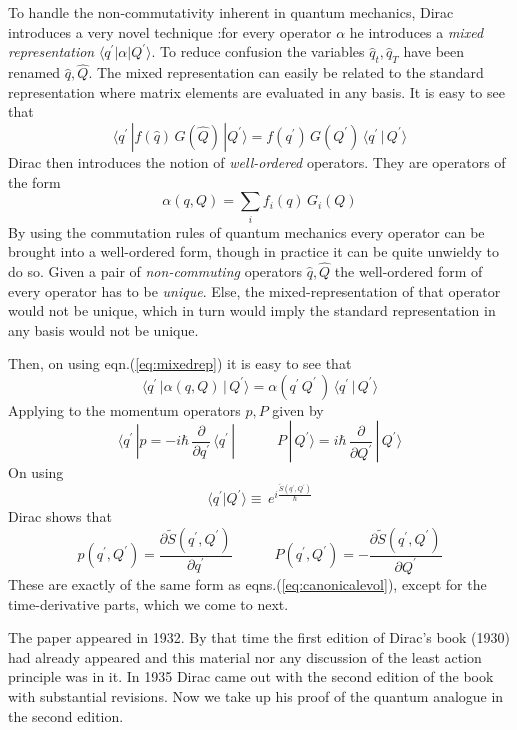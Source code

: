 \documentclass[12pt]{article}
\newcommand{\be}{\begin{equation}}
\newcommand{\ee}{\end{equation}}
\begin{document}
To handle the non-commutativity inherent in quantum mechanics, Dirac introduces a very novel technique \cite{diracpaper}:for every operator
$\alpha$ he introduces a {\it mixed representation} $\langle q^\prime|\alpha|Q^\prime\rangle$. To reduce confusion the variables 
${\hat q}_t, {\hat q}_T$
have been renamed ${\hat q},{\hat Q}$. The mixed representation can easily be related to the standard representation where matrix elements 
are evaluated 
in any basis. It is easy to see that
\be
\label{eq:mixedrep}
\langle q^\prime\,|f({\hat q})\,G({\hat Q})\,|Q^\prime \rangle  = f(q^\prime)\,G(Q^\prime)\,\langle q^\prime\,|\,Q^\prime\rangle
\ee
Dirac then introduces the notion of {\it well-ordered} operators. They are operators of the form 
\be
\label{eq:wellordered}
\alpha(q,Q) = \sum_i f_i(q)\,G_i(Q)
\ee
By using the commutation rules of quantum mechanics every operator can be brought into a well-ordered form, though in practice it can be
quite unwieldy to do so. Given a pair of \emph{non-commuting} operators ${\hat q}, {\hat Q}$ the well-ordered form of every operator has
to be \emph{unique}. Else, the mixed-representation of that operator would not be unique, which in turn would imply the standard representation
in any basis would not be unique.

Then, on using eqn.(\ref{eq:mixedrep}) it is easy to see that
\be
\label{eq:mixedrep2}
\langle q^\prime\,|\alpha(q,Q)\,|\,Q^\prime \rangle  = \alpha(q^\prime\,Q^\prime\,)\,\langle q^\prime\,|\,Q^\prime \rangle 
\ee
Applying to the momentum operators $p,P$ given by
\be
\label{eq:momenta}
\langle q^\prime\,|p = - i\hbar\,\frac{\partial}{\partial q^\prime}\,\langle q^\prime\,|\quad\quad\quad
P\,|\,Q^\prime\rangle = i\hbar\,\frac{\partial}{\partial Q^\prime}\,|\,Q^\prime\rangle
\ee
On using
\be
\langle q^\prime|Q^\prime \rangle \equiv\,e^{i \frac{{\tilde S}(q^\prime,Q^\prime)}{\hbar}}
\ee
Dirac shows that
\be
\label{eq:qanalog2}
p(q^\prime,Q^\prime) = \frac{\partial {\tilde S}(q^\prime,Q^\prime)}{\partial q^\prime}\quad\quad\quad
P(q^\prime,Q^\prime) = - \frac{\partial {\tilde S}(q^\prime,Q^\prime)}{\partial Q^\prime}
\ee
These are exactly of the same form as eqns.(\ref{eq:canonicalevol}), except for the time-derivative parts, which we come to next.

The paper \cite{diracpaper} appeared in 1932. By that time the first edition of Dirac's book (1930) \cite{diracbook1} had already
appeared and this material nor any discussion of the least action principle was in it. In 1935 Dirac came out with the second edition
of the book \cite{diracbook2} with substantial revisions. Now we take up his proof of the quantum analogue in the second edition.
\end{document}
